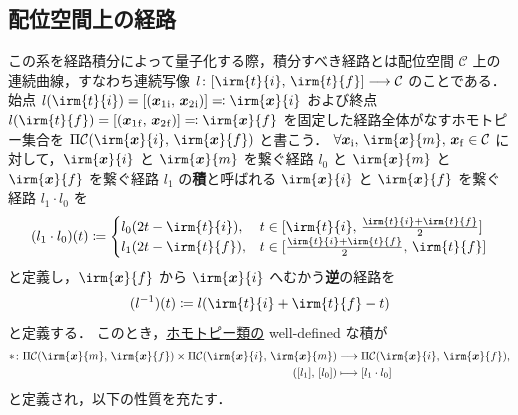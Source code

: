\documentclass[TQFT_main]{subfiles}
\begin{document}


\subsection{配位空間上の経路}

この系を経路積分によって量子化する際，積分すべき経路とは配位空間 $\mathcal{C}$ 上の連続曲線，すなわち連続写像 $l \colon [\irm{t}{i},\, \irm{t}{f}] \lto \mathcal{C}$ のことである．始点 $l(\irm{t}{i}) = [(\bm{x}_1{}_{\mathrm{i}},\, \bm{x}_2{}_{\mathrm{i}})] \eqqcolon \irm{\bm{x}}{i}$ および終点 $l(\irm{t}{f}) = [(\bm{x}_1{}_{\mathrm{f}},\, \bm{x}_2{}_{\mathrm{f}})] \eqqcolon \irm{\bm{x}}{f}$ を固定した経路全体がなすホモトピー集合を $\Pi \mathcal{C} (\irm{\bm{x}}{i},\, \irm{\bm{x}}{f})$ と書こう．
$\forall \bm{x}_{\mathrm{i}},\, \irm{\bm{x}}{m},\, \bm{x}_{\mathrm{f}} \in \mathcal{C}$ に対して，$\irm{\bm{x}}{i}$ と $\irm{\bm{x}}{m}$ を繋ぐ経路 $l_0$ と $\irm{\bm{x}}{m}$ と $\irm{\bm{x}}{f}$ を繋ぐ経路 $l_1$ の\textbf{積}と呼ばれる $\irm{\bm{x}}{i}$ と $\irm{\bm{x}}{f}$ を繋ぐ経路 $l_1 \cdot l_0$ を
\begin{align}
    (l_1 \cdot l_0)(t) \coloneqq 
    \begin{cases}
        l_0(2t - \irm{t}{i}), &t \in [\irm{t}{i},\, \frac{\irm{t}{i} + \irm{t}{f}}{2}] \\
        l_1(2t - \irm{t}{f}), &t \in [\frac{\irm{t}{i} + \irm{t}{f}}{2},\, \irm{t}{f}]
    \end{cases}
\end{align}
と定義し，$\irm{\bm{x}}{f}$ から $\irm{\bm{x}}{i}$ へむかう\textbf{逆}の経路を
\begin{align}
    (l^{-1})(t) \coloneqq l(\irm{t}{i} + \irm{t}{f} - t)
\end{align}
と定義する．
このとき，\underline{ホモトピー類の} well-defined な積が
\begin{align}
    * \colon \Pi \mathcal{C}(\irm{\bm{x}}{{m}},\, \irm{\bm{x}}{{f}}) \times  \Pi \mathcal{C}(\irm{\bm{x}}{{i}},\, \irm{\bm{x}}{{m}}) &\lto  \Pi \mathcal{C}(\irm{\bm{x}}{{i}},\, \irm{\bm{x}}{{f}}), \\
    ([l_1],\, [l_0]) &\lmto [l_1 \cdot l_0] \label{eq:1-pathprod}
\end{align}
と定義され，以下の性質を充たす．
\end{document}
